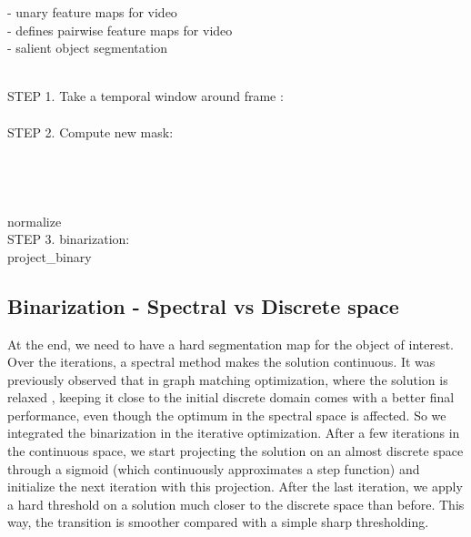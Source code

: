\documentclass{article}
\begin{document}
\begin{algorithm}[h]
    \caption{Power iteration with 3D convolutions algorithm.  At each iteration we pass through the whole video and compute the updated soft-segmentation . First, we  select a time window around current frame . Secondly we compute the eigenvector with convolutions. Then, after each iteration, we binarize the solution (see Sec.~\ref{subsec: binarization}).}
    \label{alg: power_iteration}
     - unary feature maps for video\\
     - defines pairwise feature maps for video\\
     - salient object segmentation \begin{algorithmic}[1]
        \STATE \\
         {
             {
                \STATE  STEP 1. Take a temporal window around frame :\\
                \STATE \\
\STATE  STEP 2. Compute new mask:\\
                \STATE \\
                \STATE \\
                \STATE \\
                \STATE \\
            }
            \ENDFOR
            \STATE  normalize\\
\STATE  STEP 3. binarization:\\
            \STATE  project\_binary
        }
        \ENDFOR
    \end{algorithmic}
\end{algorithm}


\subsection{Binarization - Spectral vs Discrete space}
\label{subsec: binarization}
At the end, we need to have a hard segmentation map for the object of interest. Over the iterations, a spectral method makes the solution continuous. It was previously observed that in graph matching optimization, where the solution is relaxed \cite{ipfp}, keeping it close to the initial discrete domain comes with a better final performance, even though the optimum in the spectral space is affected. So we integrated the binarization in the iterative optimization.
After a few iterations in the continuous space, we start projecting the solution on an almost discrete space through a sigmoid (which continuously approximates a step function) and initialize the next iteration with this projection. After the last iteration, we apply a hard threshold on a solution much closer to the discrete space than before. This way, the transition is smoother compared with a simple sharp thresholding. 
\end{document}
